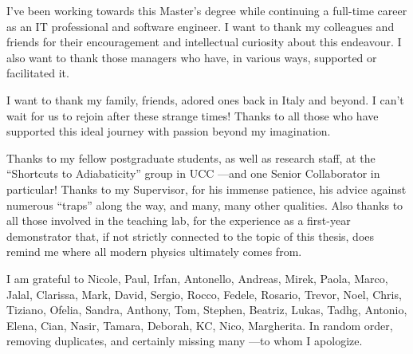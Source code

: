 
I've been working towards this Master's degree 
while continuing a full-time career as an IT professional and software engineer. 
I want to thank my colleagues and friends 
for their encouragement and intellectual curiosity about this endeavour. 
I also want to thank those managers who have, 
in various ways, 
supported or facilitated it.

I want to thank my family, friends, adored ones back in Italy and beyond.
I can’t wait for us to rejoin after these strange times!
Thanks to all those who have supported this ideal journey with passion beyond my imagination.

Thanks to  my fellow postgraduate students, as well as research staff, at the
“Shortcuts to Adiabaticity” group in UCC ---and one Senior Collaborator in particular! 
Thanks to my Supervisor, for his immense patience, his advice against numerous “traps” along the way, 
and many, many other qualities. 
Also thanks to all those involved in the teaching lab, 
for the experience as a first-year demonstrator that, 
if not strictly connected to the topic of this thesis, 
does remind me where all modern physics ultimately comes from.

I am grateful to Nicole, Paul, Irfan, Antonello, Andreas, Mirek, Paola, Marco,
Jalal, Clarissa, Mark, David, Sergio, Rocco, Fedele, Rosario, Trevor, Noel, Chris, Tiziano, Ofelia,
Sandra, Anthony, Tom, Stephen, Beatriz, Lukas, Tadhg, Antonio, Elena, Cian, Nasir, Tamara, 
Deborah, KC, Nico, Margherita. 
In random order, removing duplicates, and certainly missing many ---to whom I apologize.
